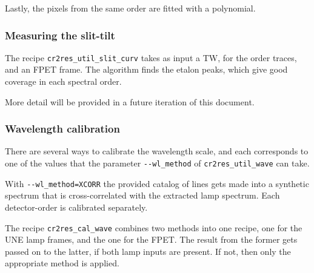 Lastly, the pixels from the same order are fitted with a polynomial.


\subsubsection{Measuring the slit-tilt}
\label{sec:tilt}

The recipe \verb!cr2res_util_slit_curv! takes as input a TW, for the order traces, and an FPET frame. The algorithm finds the etalon peaks, which give good coverage in each spectral order.

More detail will be provided in a future iteration of this document.

\subsubsection{Wavelength calibration}

There are several ways to calibrate the wavelength scale, and each corresponds
to one of the values that the parameter \texttt{-{}-wl\_method} of
\texttt{cr2res\_util\_wave} can take.

With \texttt{-{}-wl\_method=XCORR} the provided catalog of lines gets made into
a synthetic spectrum that is cross-correlated with the extracted lamp spectrum.
Each detector-order is calibrated separately.

The recipe \texttt{cr2res\_cal\_wave} combines two methods into one recipe, one
for the UNE lamp frames, and the one for the FPET. The result from the former
gets passed on to the latter, if both lamp inputs are present. If not, then only
the appropriate method is applied.